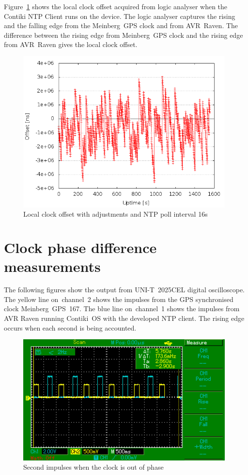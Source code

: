 Figure~\ref{fig:app-ntp-la} shows the local clock offset
acquired from logic analyser when the Contiki NTP Client runs on the device.
The logic analyser captures the rising and the falling edge
from the Meinberg~GPS clock and from AVR~Raven.
The difference between the rising edge from
Meinberg~GPS clock and the rising edge from AVR~Raven gives the local clock offset.
\begin{figure}[H]
  \centering
  \includegraphics[width=11cm,keepaspectratio]{fig/la.png}
  \caption{Local clock offset with adjustments and NTP poll interval 16s}
  \label{fig:app-ntp-la}
\end{figure}


\chapter{Clock phase difference measurements}\label{app:phase}
The following figures show the output from UNI-T~2025CEL digital oscilloscope.
The yellow line on~channel~2 shows the impulses from the GPS synchronised clock Meinberg~GPS~167.
The blue line on~channel~1 shows the impulses from AVR Raven running
Contiki~OS with the developed NTP client.
The rising edge occurs when each second is being accounted.
\begin{figure}[H]
  \centering
  \includegraphics[width=11cm,keepaspectratio]{fig/osc-out-of-phase.png}
  \caption{Second impulses when the clock is out of phase}
  \label{fig:app-osc-out-of-phase}
  \bigskip
\end{figure}


